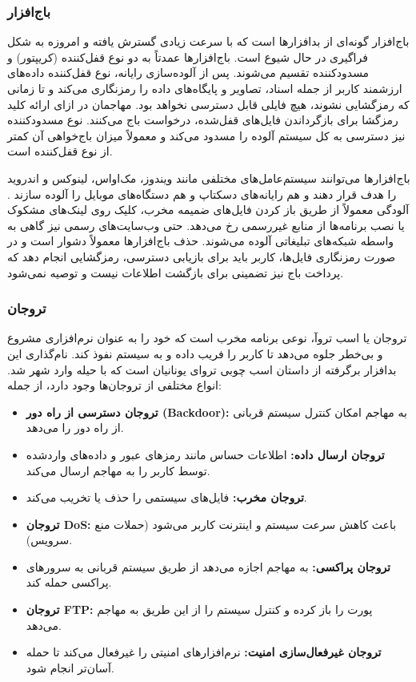 \subsubsection{باج‌افزار}
باج‌افزار گونه‌ای از بدافزارها است که با سرعت زیادی گسترش یافته و امروزه به شکل فراگیری در حال شیوع است. باج‌افزارها عمدتاً به دو نوع قفل‌کننده (کریپتور) و مسدودکننده تقسیم می‌شوند. پس از آلوده‌سازی رایانه، نوع قفل‌کننده داده‌های ارزشمند کاربر از جمله اسناد، تصاویر و پایگاه‌های داده را رمزنگاری می‌کند و تا زمانی که رمزگشایی نشوند، هیچ فایلی قابل دسترسی نخواهد بود. مهاجمان در ازای ارائه کلید رمزگشا برای بازگرداندن فایل‌های قفل‌شده، درخواست باج می‌کنند. نوع مسدودکننده نیز دسترسی به کل سیستم آلوده را مسدود می‌کند و معمولاً میزان باج‌خواهی آن کمتر از نوع قفل‌کننده است.

باج‌افزارها می‌توانند سیستم‌عامل‌های مختلفی مانند ویندوز، مک‌اواس، لینوکس و اندروید را هدف قرار دهند و هم رایانه‌های دسکتاپ و هم دستگاه‌های موبایل را آلوده سازند \cite{AndroidSecurity}. آلودگی معمولاً از طریق باز کردن فایل‌های ضمیمه مخرب، کلیک روی لینک‌های مشکوک یا نصب برنامه‌ها از منابع غیررسمی رخ می‌دهد. حتی وب‌سایت‌های رسمی نیز گاهی به واسطه شبکه‌های تبلیغاتی آلوده می‌شوند. حذف باج‌افزارها معمولاً دشوار است و در صورت رمزنگاری فایل‌ها، کاربر باید برای بازیابی دسترسی، رمزگشایی انجام دهد که پرداخت باج نیز تضمینی برای بازگشت اطلاعات نیست و توصیه نمی‌شود.

\subsubsection{تروجان}
تروجان یا اسب تروآ، نوعی برنامه مخرب است که خود را به عنوان نرم‌افزاری مشروع و بی‌خطر جلوه می‌دهد تا کاربر را فریب داده و به سیستم نفوذ کند. نام‌گذاری این بدافزار برگرفته از داستان اسب چوبی تروای یونانیان است که با حیله وارد شهر شد. انواع مختلفی از تروجان‌ها وجود دارد، از جمله:
\begin{itemize}
    \item \textbf{تروجان دسترسی از راه دور (Backdoor):} به مهاجم امکان کنترل سیستم قربانی از راه دور را می‌دهد.
    \item \textbf{تروجان ارسال داده:} اطلاعات حساس مانند رمزهای عبور و داده‌های واردشده توسط کاربر را به مهاجم ارسال می‌کند.
    \item \textbf{تروجان مخرب:} فایل‌های سیستمی را حذف یا تخریب می‌کند.
    \item \textbf{تروجان DoS:} باعث کاهش سرعت سیستم و اینترنت کاربر می‌شود (حملات منع سرویس).
    \item \textbf{تروجان پراکسی:} به مهاجم اجازه می‌دهد از طریق سیستم قربانی به سرورهای پراکسی حمله کند.
    \item \textbf{تروجان FTP:} پورت  را باز کرده و کنترل سیستم را از این طریق به مهاجم می‌دهد.
    \item \textbf{تروجان غیرفعال‌سازی امنیت:} نرم‌افزارهای امنیتی را غیرفعال می‌کند تا حمله آسان‌تر انجام شود.
\end{itemize}

